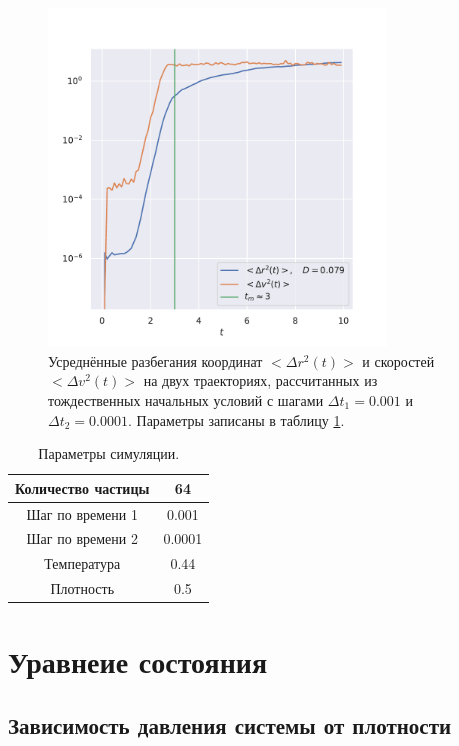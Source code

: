 \documentclass[a4paper,12pt]{article}
\begin{document}
\begin{figure}[H]
    \centering
    \includegraphics[width=0.8\textwidth]{../../media/tm.pdf}
    \caption{Усреднённые разбегания координат \(<\Delta r^2(t)>\) и скоростей \(<\Delta v^2(t)>\) на двух траекториях, рассчитанных из тождественных начальных условий с шагами \(\Delta t_1 = 0.001\) и \(\Delta t_2 = 0.0001\). Параметры записаны в таблицу \ref{tab1}.}
\end{figure}

\begin{table}[H]
    \centering
    \caption{Параметры симуляции.}
    \label{tab1}
    \begin{tabular}{| c | c |}
        \hline
        Количество частицы & 64 \\
        \hline
        Шаг по времени 1 & 0.001 \\
        \hline
        Шаг по времени 2 & 0.0001 \\
        \hline
        Температура & 0.44 \\
        \hline
        Плотность & 0.5 \\
        \hline
    \end{tabular}
\end{table}

\section{Уравнеие состояния}

\subsection{Зависимость давления системы от плотности}
\end{document}
